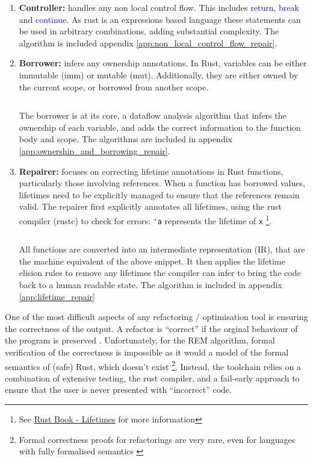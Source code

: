 \begin{enumerate}[itemsep=0pt]
    \item \textbf{Controller:} handles any non local control flow. This includes
    \textcolor{blue}{return}, \textcolor{blue}{break} and
    \textcolor{blue}{continue}. As rust is an expressions based language
    \cite{rbooka} these statements can be used in arbitrary
    combinations, adding substantial complexity. The algorithm is included appendix
    \ref{app:non_local_control_flow_repair}.
    \item \textbf{Borrower:} infers any ownership annotations. In Rust,
    variables can be either immutable (imm) or mutable (mut). Additionally, they
    are either owned by the current scope, or borrowed from another scope.

    {\small
    \inputminted[linenos, tabsize=2]{rust}{snippets/borrow.rs}}

    The borrower is at its core, a dataflow analysis algorithm that infers the ownership of each
    variable, and adds the correct information to the function body and scope.
    The algorithms are included in appendix \ref{app:ownership_and_borrowing_repair}.
    \item \textbf{Repairer:} focuses on correcting lifetime annotations in Rust
    functions, particularly those involving references. When a function has
    borrowed values, lifetimes need to be explicitly managed to ensure that the
    references remain valid. The repairer first explicitly annotates all
    lifetimes, using the rust compiler (rustc) to check for errors: \verb|'a|
    represents the lifetime of \verb|x| \footnote{See
    \href{https://doc.rust-lang.org/nomicon/lifetimes.html}{Rust Book -
    Lifetimes} for more information}.

    {\small
    \inputminted[]{rust}{snippets/lifetime.rs}}

    All functions are converted into an intermediate representation (IR), that
    are the machine equivalent of the above snippet. It then applies
    the lifetime elision rules \cite{rbookb} to remove any lifetimes the
    compiler can infer to bring the code back to a human readable
    state.
    The algorithm is included in appendix \ref{app:lifetime_repair}
\end{enumerate}

One of the most difficult aspects of any refactoring / optimisation tool is
ensuring the correctness of the output. A refactor is ``correct'' if the orginal
behaviour of the program is preserved \cite{ProvingCompilerOptimisations}.
Unfortunately, for the REM algorithm, formal verification of the correctness is
impossible as it would a model of the formal semantics of (safe) Rust, which
doesn't exist \footnote{Formal correctness proofs for refactorings are very
rare, even for languages with fully formalised semantics
\cite{AdventureOfALifetime}}. Instead, the toolchain relies on a combination of
extensive testing, the rust compiler, and a fail-early approach to ensure that
the user is never presented with ``incorrect'' code.


